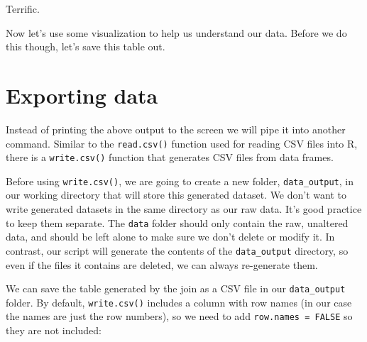 \documentclass[]{book}
\newenvironment{Shaded}{\begin{snugshade}}{\end{snugshade}}
\newcommand{\KeywordTok}[1]{\textcolor[rgb]{0.13,0.29,0.53}{\textbf{#1}}}
\newcommand{\DataTypeTok}[1]{\textcolor[rgb]{0.13,0.29,0.53}{#1}}
\newcommand{\DecValTok}[1]{\textcolor[rgb]{0.00,0.00,0.81}{#1}}
\newcommand{\StringTok}[1]{\textcolor[rgb]{0.31,0.60,0.02}{#1}}
\newcommand{\OtherTok}[1]{\textcolor[rgb]{0.56,0.35,0.01}{#1}}
\newcommand{\OperatorTok}[1]{\textcolor[rgb]{0.81,0.36,0.00}{\textbf{#1}}}
\newcommand{\NormalTok}[1]{#1}
\theoremstyle{definition}
\theoremstyle{definition}
\theoremstyle{definition}
\theoremstyle{remark}
\begin{document}
Terrific.

Now let's use some visualization to help us understand our data. Before
we do this though, let's save this table out.

\section{Exporting data}\label{exporting-data}

Instead of printing the above output to the screen we will pipe it into
another command. Similar to the \texttt{read.csv()} function used for
reading CSV files into R, there is a \texttt{write.csv()} function that
generates CSV files from data frames.

Before using \texttt{write.csv()}, we are going to create a new folder,
\texttt{data\_output}, in our working directory that will store this
generated dataset. We don't want to write generated datasets in the same
directory as our raw data. It's good practice to keep them separate. The
\texttt{data} folder should only contain the raw, unaltered data, and
should be left alone to make sure we don't delete or modify it. In
contrast, our script will generate the contents of the
\texttt{data\_output} directory, so even if the files it contains are
deleted, we can always re-generate them.

We can save the table generated by the join as a CSV file in our
\texttt{data\_output} folder. By default, \texttt{write.csv()} includes
a column with row names (in our case the names are just the row
numbers), so we need to add \texttt{row.names\ =\ FALSE} so they are not
included:

\begin{Shaded}
\end{Shaded}
\end{document}
